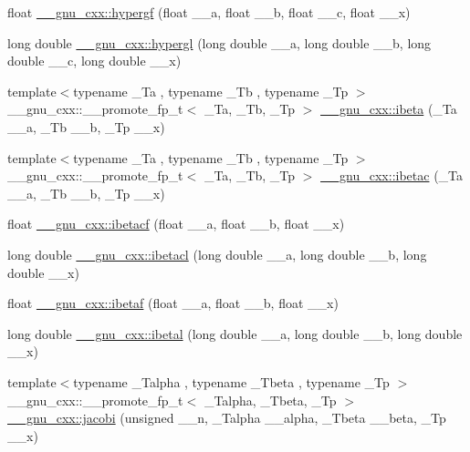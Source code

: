 \begin{DoxyCompactItemize}
\item 
float \hyperlink{group__gnu__math__spec__func_gac4c81e4ea9cef149fe40291ca10d7e15}{\+\_\+\+\_\+gnu\+\_\+cxx\+::hypergf} (float \+\_\+\+\_\+a, float \+\_\+\+\_\+b, float \+\_\+\+\_\+c, float \+\_\+\+\_\+x)
\item 
long double \hyperlink{group__gnu__math__spec__func_ga9961967087216e97f76283f29e1be152}{\+\_\+\+\_\+gnu\+\_\+cxx\+::hypergl} (long double \+\_\+\+\_\+a, long double \+\_\+\+\_\+b, long double \+\_\+\+\_\+c, long double \+\_\+\+\_\+x)
\item 
{\footnotesize template$<$typename \+\_\+\+Ta , typename \+\_\+\+Tb , typename \+\_\+\+Tp $>$ }\\\+\_\+\+\_\+gnu\+\_\+cxx\+::\+\_\+\+\_\+promote\+\_\+fp\+\_\+t$<$ \+\_\+\+Ta, \+\_\+\+Tb, \+\_\+\+Tp $>$ \hyperlink{group__gnu__math__spec__func_gae9a18423e325171ca0c61b411258fa65}{\+\_\+\+\_\+gnu\+\_\+cxx\+::ibeta} (\+\_\+\+Ta \+\_\+\+\_\+a, \+\_\+\+Tb \+\_\+\+\_\+b, \+\_\+\+Tp \+\_\+\+\_\+x)
\item 
{\footnotesize template$<$typename \+\_\+\+Ta , typename \+\_\+\+Tb , typename \+\_\+\+Tp $>$ }\\\+\_\+\+\_\+gnu\+\_\+cxx\+::\+\_\+\+\_\+promote\+\_\+fp\+\_\+t$<$ \+\_\+\+Ta, \+\_\+\+Tb, \+\_\+\+Tp $>$ \hyperlink{group__gnu__math__spec__func_ga43708e36e01ce6d628ada3aee9be9490}{\+\_\+\+\_\+gnu\+\_\+cxx\+::ibetac} (\+\_\+\+Ta \+\_\+\+\_\+a, \+\_\+\+Tb \+\_\+\+\_\+b, \+\_\+\+Tp \+\_\+\+\_\+x)
\item 
float \hyperlink{group__gnu__math__spec__func_gabd7fa090deead18b167c26b8994b9f53}{\+\_\+\+\_\+gnu\+\_\+cxx\+::ibetacf} (float \+\_\+\+\_\+a, float \+\_\+\+\_\+b, float \+\_\+\+\_\+x)
\item 
long double \hyperlink{group__gnu__math__spec__func_ga48995d537b82e426362a4831ffa1be39}{\+\_\+\+\_\+gnu\+\_\+cxx\+::ibetacl} (long double \+\_\+\+\_\+a, long double \+\_\+\+\_\+b, long double \+\_\+\+\_\+x)
\item 
float \hyperlink{group__gnu__math__spec__func_ga97a5e3afdd990a2d3e199df6856bcf9f}{\+\_\+\+\_\+gnu\+\_\+cxx\+::ibetaf} (float \+\_\+\+\_\+a, float \+\_\+\+\_\+b, float \+\_\+\+\_\+x)
\item 
long double \hyperlink{group__gnu__math__spec__func_ga5c9c5b583e4f1c9785a1c4582551c97f}{\+\_\+\+\_\+gnu\+\_\+cxx\+::ibetal} (long double \+\_\+\+\_\+a, long double \+\_\+\+\_\+b, long double \+\_\+\+\_\+x)
\item 
{\footnotesize template$<$typename \+\_\+\+Talpha , typename \+\_\+\+Tbeta , typename \+\_\+\+Tp $>$ }\\\+\_\+\+\_\+gnu\+\_\+cxx\+::\+\_\+\+\_\+promote\+\_\+fp\+\_\+t$<$ \+\_\+\+Talpha, \+\_\+\+Tbeta, \+\_\+\+Tp $>$ \hyperlink{group__gnu__math__spec__func_ga3dea9ec3774ee5db50276597bbfb0afa}{\+\_\+\+\_\+gnu\+\_\+cxx\+::jacobi} (unsigned \+\_\+\+\_\+n, \+\_\+\+Talpha \+\_\+\+\_\+alpha, \+\_\+\+Tbeta \+\_\+\+\_\+beta, \+\_\+\+Tp \+\_\+\+\_\+x)

\end{DoxyCompactItemize}
